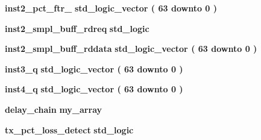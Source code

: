 \begin{DoxyCompactItemize}
\item 
{\bf inst2\+\_\+pct\+\_\+ftr\+\_} {\bfseries \textcolor{comment}{std\+\_\+logic\+\_\+vector}\textcolor{vhdlchar}{ }\textcolor{vhdlchar}{(}\textcolor{vhdlchar}{ }\textcolor{vhdlchar}{ } \textcolor{vhdldigit}{63} \textcolor{vhdlchar}{ }\textcolor{keywordflow}{downto}\textcolor{vhdlchar}{ }\textcolor{vhdlchar}{ } \textcolor{vhdldigit}{0} \textcolor{vhdlchar}{ }\textcolor{vhdlchar}{)}\textcolor{vhdlchar}{ }} 
\item 
{\bf inst2\+\_\+smpl\+\_\+buff\+\_\+rdreq} {\bfseries \textcolor{comment}{std\+\_\+logic}\textcolor{vhdlchar}{ }} 
\item 
{\bf inst2\+\_\+smpl\+\_\+buff\+\_\+rddata} {\bfseries \textcolor{comment}{std\+\_\+logic\+\_\+vector}\textcolor{vhdlchar}{ }\textcolor{vhdlchar}{(}\textcolor{vhdlchar}{ }\textcolor{vhdlchar}{ } \textcolor{vhdldigit}{63} \textcolor{vhdlchar}{ }\textcolor{keywordflow}{downto}\textcolor{vhdlchar}{ }\textcolor{vhdlchar}{ } \textcolor{vhdldigit}{0} \textcolor{vhdlchar}{ }\textcolor{vhdlchar}{)}\textcolor{vhdlchar}{ }} 
\item 
{\bf inst3\+\_\+q} {\bfseries \textcolor{comment}{std\+\_\+logic\+\_\+vector}\textcolor{vhdlchar}{ }\textcolor{vhdlchar}{(}\textcolor{vhdlchar}{ }\textcolor{vhdlchar}{ } \textcolor{vhdldigit}{63} \textcolor{vhdlchar}{ }\textcolor{keywordflow}{downto}\textcolor{vhdlchar}{ }\textcolor{vhdlchar}{ } \textcolor{vhdldigit}{0} \textcolor{vhdlchar}{ }\textcolor{vhdlchar}{)}\textcolor{vhdlchar}{ }} 
\item 
{\bf inst4\+\_\+q} {\bfseries \textcolor{comment}{std\+\_\+logic\+\_\+vector}\textcolor{vhdlchar}{ }\textcolor{vhdlchar}{(}\textcolor{vhdlchar}{ }\textcolor{vhdlchar}{ } \textcolor{vhdldigit}{63} \textcolor{vhdlchar}{ }\textcolor{keywordflow}{downto}\textcolor{vhdlchar}{ }\textcolor{vhdlchar}{ } \textcolor{vhdldigit}{0} \textcolor{vhdlchar}{ }\textcolor{vhdlchar}{)}\textcolor{vhdlchar}{ }} 
\item 
{\bf delay\+\_\+chain} {\bfseries {\bfseries {\bf my\+\_\+array}} \textcolor{vhdlchar}{ }} 
\item 
{\bf tx\+\_\+pct\+\_\+loss\+\_\+detect} {\bfseries \textcolor{comment}{std\+\_\+logic}\textcolor{vhdlchar}{ }} 
\end{DoxyCompactItemize}
